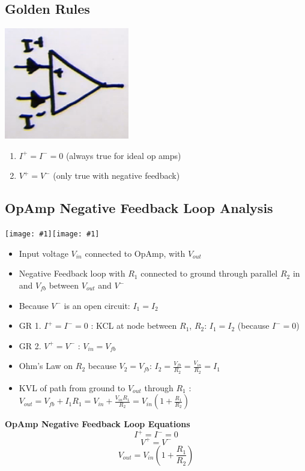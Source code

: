 \documentclass{article}\usepackage{amsmath,amssymb,amsthm,tikz,tkz-graph,color,chngpage,soul,hyperref,csquotes,graphicx,floatrow}\newcommand*{\QEDB}{\hfill\ensuremath{\square}}\newtheorem*{prop}{Proposition}\renewcommand{\theenumi}{\alph{enumi}}\usepackage[shortlabels]{enumitem}\usepackage[nobreak=true]{mdframed}\usetikzlibrary{matrix,calc}\MakeOuterQuote{"}\usepackage[margin=0.75in]{geometry} \newtheorem{theorem}{Theorem}
\newcommand{\dincludegraphics}[1]{\texttt{[image: \#1]}}
\begin{document}
\subsection*{Golden Rules}
\begin{center}\includegraphics{opcurr}\end{center}
\begin{mdframed}
\begin{enumerate}[1.]
    \item $I^+ = I^- = 0$ (always true for ideal op amps)
    \item $V^+ = V^-$ (only true with negative feedback)
\end{enumerate}
\end{mdframed}
\subsection*{OpAmp Negative Feedback Loop Analysis}
\begin{center}\dincludegraphics{opnfl}\dincludegraphics{opnflkvl}\end{center}
\begin{itemize}
    \item Input voltage $V_{in}$ connected to OpAmp, with $V_{out}$
    \item Negative Feedback loop with $R_1$ connected to ground through parallel $R_2$ in and $V_{fb}$ between $V_{out}$ and $V^-$
    \item Because $V^-$ is an open circuit: $I_1 = I_2$
    \item GR 1. $I^+ = I^- = 0$ : KCL at node between $R_1$, $R_2$: $I_1 = I_2$ (because $I^- = 0$)
    \item GR 2. $V^+ = V^-$ : $V_{in} = V_{fb}$
    \item Ohm's Law on $R_2$ because $V_2 = V_{fb}$: $I_2 = \frac{V_{fb}}{R_2} = \frac{V_{in}}{R_2}= I_1$
    \item KVL of path from ground to $V_{out}$ through $R_1$ : $V_{out} = V_{fb}+I_1R_1 = V_{in}+\frac{V_{in}R_1}{R_2} = V_{in}(1+\frac{R_1}{R_2})$
\end{itemize}
\begin{mdframed}
\textbf{OpAmp Negative Feedback Loop Equations}
\begin{equation}I^+ = I^- = 0\end{equation}
\begin{equation}V^+ = V^-\end{equation}
\begin{equation}V_{out} = V_{in}(1+\frac{R_1}{R_2})\end{equation}
\end{mdframed}
\end{document}
